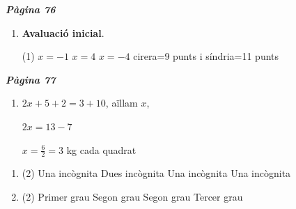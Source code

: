 \documentclass[a4paper, pdf, twoside]{book}
\begin{document}
\begin{multicols}{2}
 

\vspace*{0.4cm}
 {}
\vspace{0.3cm}


{\textbf{\em Pàgina 76}} \hrulefill
\begin{enumerate}
\vspace{0.25cm}



 \item[$\bullet$ ] {\selectfont\color{blue}\textbf{Avaluació inicial}. } 
 \begin{tasks}[column-sep=1em, item-indent=1.3333em](1)
	 \task $x=-1$
	 \task $x=4$
	 \task $x=-4$
	 \task* cirera=9 punts i síndria=11 punts
\end{tasks}
 \end{enumerate}
\vspace{0.3cm}


{\textbf{\em Pàgina 77}} \hrulefill
\begin{enumerate}
\vspace{0.25cm}
\item[\fontfamily{phv}\selectfont\color{blue}\textbf{1. }] 
$2x+5+2=3+10$, aïllam $x$,\par $2x=13-7$\par $x=\frac {6}{2}=3$ kg cada quadrat
 \end{enumerate}
\begin{enumerate}
\vspace{0.25cm}



 \item[\fontfamily{phv}\selectfont\color{blue}\textbf{2}. ] 
 \begin{tasks}[column-sep=1em, item-indent=1.3333em](2)
	 \task Una incògnita
	 \task Dues incògnita
	 \task Una incògnita
	 \task Una incògnita
\end{tasks}
\vspace{0.25cm}



 \item[\fontfamily{phv}\selectfont\color{blue}\textbf{3}. ] 
 \begin{tasks}[column-sep=1em, item-indent=1.3333em](2)
	 \task Primer grau
	 \task Segon grau
	 \task Segon grau
	 \task Tercer grau
\end{tasks}
\vspace{0.25cm}



\end{enumerate}
\end{multicols}
\end{document}
